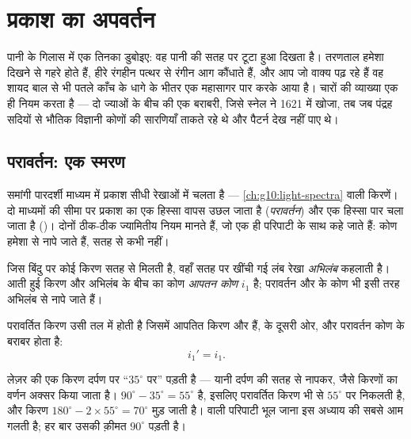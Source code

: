 \chapter{प्रकाश का अपवर्तन}\label{ch:g10:refraction}

पानी के गिलास में एक तिनका डुबोइए: वह पानी की सतह पर टूटा हुआ दिखता है।
तरणताल हमेशा दिखने से गहरे होते हैं, हीरे रंगहीन पत्थर से रंगीन आग
कौंधाते हैं, और आप जो वाक्य पढ़ रहे हैं वह शायद बाल से भी पतले काँच के
धागे के भीतर एक महासागर पार करके आया है। चारों की व्याख्या एक ही
नियम करता है --- दो ज्याओं के बीच की एक बराबरी, जिसे स्नेल ने 1621 में
खोजा, तब जब पंद्रह सदियों से भौतिक विज्ञानी कोणों की सारणियाँ ताकते रहे
थे और पैटर्न देख नहीं पाए थे।

\section{परावर्तन: एक स्मरण}

समांगी पारदर्शी माध्यम में प्रकाश सीधी रेखाओं में चलता है --- \cref{ch:g10:light-spectra}
वाली किरणें। दो माध्यमों की सीमा पर प्रकाश का एक हिस्सा वापस उछल जाता
है (\emph{परावर्तन}) और एक हिस्सा पार चला जाता है
(\emph{})। दोनों ठीक-ठीक ज्यामितीय नियम मानते हैं, जो एक
ही परिपाटी के साथ कहे जाते हैं: कोण हमेशा \emph{} से नापे
जाते हैं, सतह से कभी नहीं।

\begin{definition}[अभिलंब और आपतन कोण]\label{def:g10:refraction:angles}
जिस बिंदु पर कोई किरण सतह से मिलती है, वहाँ सतह पर खींची गई लंब रेखा
\emph{अभिलंब} कहलाती है। आती हुई किरण और अभिलंब के बीच का
कोण \emph{आपतन कोण} $i_1$ है; परावर्तन और
 के कोण भी इसी तरह अभिलंब से नापे जाते हैं।
\end{definition}

\begin{proposition}[परावर्तन का नियम]\label{prop:g10:refraction:reflection}
परावर्तित किरण उसी तल में होती है जिसमें आपतित किरण और 
हैं,  के दूसरी ओर, और परावर्तन कोण  के
बराबर होता है:
\[
i_1' = i_1 .
\]
\end{proposition}
\admitted

\begin{example}[कोण सही ढंग से पढ़ना]\label{ex:g10:refraction:mirror}
लेज़र की एक किरण दर्पण पर ``$35^\circ$ पर'' पड़ती है --- यानी दर्पण की सतह
से नापकर, जैसे किरणों का वर्णन अक्सर किया जाता है। 
$90^\circ - 35^\circ = 55^\circ$ है, इसलिए परावर्तित किरण भी  से $55^\circ$ पर निकलती
है, और किरण $180^\circ - 2 \times 55^\circ = 70^\circ$ मुड़ जाती है।  वाली परिपाटी भूल जाना
इस अध्याय की सबसे आम गलती है; हर बार उसकी क़ीमत $90^\circ$ पड़ती है।
\end{example}

